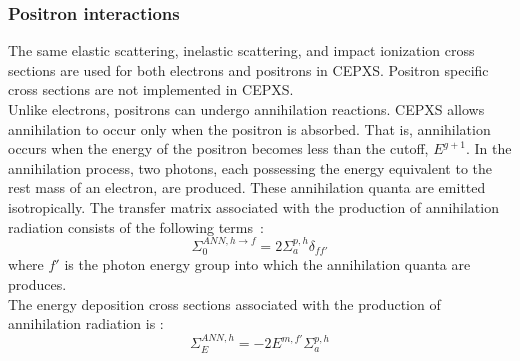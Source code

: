 \subsubsection{Positron interactions}
The same elastic scattering, inelastic scattering, and impact ionization cross
sections are used for both electrons and positrons in CEPXS. Positron specific
cross sections are not implemented in CEPXS.\\
Unlike electrons, positrons can undergo annihilation reactions. CEPXS allows
annihilation to occur only when the positron is absorbed. That is,
annihilation occurs when the energy of the positron becomes less than the
cutoff, $E^{g+1}$. In the annihilation process, two photons, each possessing
the energy equivalent to the rest mass of an electron, are produced. These
annihilation quanta are emitted isotropically. The transfer matrix associated
with the production of annihilation radiation consists of the following
\hbox{terms :}
\begin{equation}
\Sigma_{0}^{ANN,h\rightarrow f} = 2 \Sigma_{a}^{p,h} \delta_{ff'}
\end{equation}
where $f'$ is the photon energy group into which the annihilation quanta are
produces.\\
The energy deposition cross sections associated with the production of annihilation 
radiation is :
\begin{equation}
\Sigma_E^{ANN,h} = -2 E^{m,f'}\Sigma_a^{p,h}
\end{equation}

